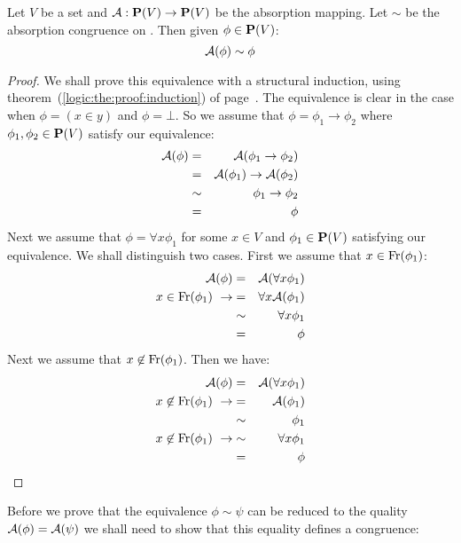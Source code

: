 \begin{prop}\label{logic:prop:FOPL:absmapping:equivalence:A:phi}
Let $V$ be a set and ${\cal A}:\mbox{${\bf P}(V)$}\to\mbox{${\bf P}(V)$}$ be the absorption mapping.
Let $\sim$ be the absorption congruence on \pv. Then given
$\phi\in\mbox{${\bf P}(V)$}$:
    \[
    {\cal A}(\phi)\sim\phi
    \]
\end{prop}
\begin{proof}
We shall prove this equivalence with a structural induction, using
theorem~(\ref{logic:the:proof:induction}) of
page~\pageref{logic:the:proof:induction}. The equivalence is clear
in the case when $\phi=(x\in y)$ and $\phi=\bot$. So we assume that
$\phi=\phi_{1}\to\phi_{2}$ where $\phi_{1},\phi_{2}\in\mbox{${\bf P}(V)$}$ satisfy
our equivalence:
    \begin{eqnarray*}
    {\cal A}(\phi)&=&{\cal A}(\phi_{1}\to\phi_{2})\\
    &=&{\cal A}(\phi_{1})\to{\cal A}(\phi_{2})\\
    &\sim&\phi_{1}\to\phi_{2}\\
    &=&\phi
    \end{eqnarray*}
Next we assume that $\phi=\forall x\phi_{1}$ for some $x\in V$ and
$\phi_{1}\in\mbox{${\bf P}(V)$}$ satisfying our equivalence. We shall distinguish
two cases. First we assume that $x\in\mbox{\rm Fr}(\phi_{1})$:
    \begin{eqnarray*}
    {\cal A}(\phi)&=&{\cal A}(\forall x\phi_{1})\\
    x\in\mbox{\rm Fr}(\phi_{1})\ \rightarrow
    &=&\forall x{\cal A}(\phi_{1})\\
    &\sim&\forall x\phi_{1}\\
    &=&\phi
    \end{eqnarray*}
Next we assume that $x\not\in\mbox{\rm Fr}(\phi_{1})$. Then we have:
\begin{eqnarray*}
    {\cal A}(\phi)&=&{\cal A}(\forall x\phi_{1})\\
    x\not\in\mbox{\rm Fr}(\phi_{1})\ \rightarrow
    &=&{\cal A}(\phi_{1})\\
    &\sim&\phi_{1}\\
    x\not\in\mbox{\rm Fr}(\phi_{1})\ \rightarrow
    &\sim&\forall x\phi_{1}\\
    &=&\phi
    \end{eqnarray*}
\end{proof}


Before we prove that the equivalence $\phi\sim\psi$ can be reduced
to the quality ${\cal A}(\phi)={\cal A}(\psi)$ we shall need to show
that this equality defines a congruence:


